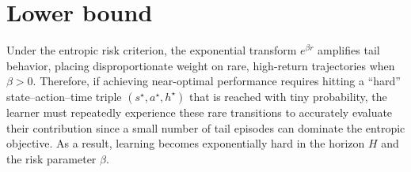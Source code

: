 \documentclass[final,12pt]{colt2026} %
\begin{document}
\section{Lower bound}\label{sec:lower_bound}
Under the entropic risk criterion, the exponential transform $e^{\beta r}$ amplifies tail behavior, placing disproportionate weight on rare, high-return trajectories when $\beta>0$. Therefore, if achieving near-optimal performance requires hitting a ``hard'' state--action--time triple $(s^\star,a^\star,h^\star)$ that is reached with tiny probability, the learner must repeatedly experience these rare transitions to accurately evaluate their contribution since a small number of tail episodes can dominate the entropic objective. As a result, learning becomes exponentially hard in the horizon $H$ and the risk parameter $\beta$.
\end{document}
